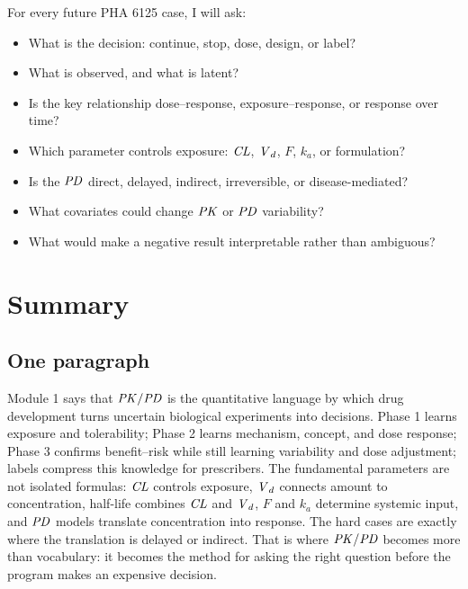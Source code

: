 \documentclass[a4paper]{article}
\newcommand{\CL}{\ensuremath{\pksym{CL}}}
\newcommand{\Vd}{\ensuremath{\pksym{V}_d}}
\newcommand{\ka}{\ensuremath{k_a}}
\newcommand{\Fbio}{\ensuremath{F}}
\newcommand{\PK}{\ensuremath{\pksym{PK}}}
\newcommand{\PD}{\ensuremath{\pksym{PD}}}
\newcommand{\PKPD}{\ensuremath{\pksym{PK}/\pksym{PD}}}
\begin{document}
For every future PHA 6125 case, I will ask:
\begin{itemize}[leftmargin=2em]
  \item What is the decision: continue, stop, dose, design, or label?
  \item What is observed, and what is latent?
  \item Is the key relationship dose--response, exposure--response, or response over time?
  \item Which parameter controls exposure: \CL, \Vd, \Fbio, \(\ka\), or formulation?
  \item Is the \PD{} direct, delayed, indirect, irreversible, or disease-mediated?
  \item What covariates could change \PK{} or \PD{} variability?
  \item What would make a negative result interpretable rather than ambiguous?
\end{itemize}

\section{Summary}

\subsection{One paragraph}

Module 1 says that \PKPD{} is the quantitative language by which drug development turns uncertain biological experiments into decisions. Phase 1 learns exposure and tolerability; Phase 2 learns mechanism, concept, and dose response; Phase 3 confirms benefit--risk while still learning variability and dose adjustment; labels compress this knowledge for prescribers. The fundamental parameters are not isolated formulas: \CL{} controls exposure, \Vd{} connects amount to concentration, half-life combines \CL{} and \Vd, \Fbio{} and \(\ka\) determine systemic input, and \PD{} models translate concentration into response. The hard cases are exactly where the translation is delayed or indirect. That is where \PKPD{} becomes more than vocabulary: it becomes the method for asking the right question before the program makes an expensive decision.



\end{document}
